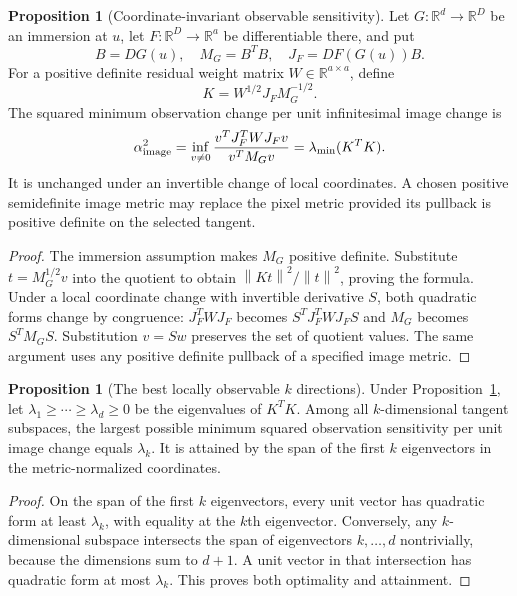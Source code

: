 \documentclass[11pt,a4paper]{article}
\theoremstyle{definition}
\newtheorem{proposition}[theorem]{Proposition}
\theoremstyle{definition}
\theoremstyle{remark}\newtheorem{remark}[theorem]{Remark}
\newcommand{\R}{\mathbb R}\newcommand{\Prob}{\mathbb P}\newcommand{\E}{\mathbb E}
\newcommand{\norm}[1]{\left\lVert #1\right\rVert}
\begin{document}
\begin{proposition}[Coordinate-invariant observable sensitivity]\label{prop:metric}
Let $G:\R^d\to\R^D$ be an immersion at $u$, let $F:\R^D\to\R^a$ be differentiable there, and put
\[
B=DG(u),\quad M_G=B^TB,\quad J_F=DF(G(u))B.
\]
For a positive definite residual weight matrix $W\in\R^{a\times a}$, define
\[
K=W^{1/2}J_FM_G^{-1/2}.
\]
The squared minimum observation change per unit infinitesimal image change is
\begin{equation}\label{eq:intrinsicmetric}
\alpha_{\rm image}^2
=\inf_{v\ne0}\frac{v^TJ_F^TWJ_Fv}{v^TM_Gv}
=\lambda_{\min}(K^TK).
\end{equation}
It is unchanged under an invertible change of local coordinates. A chosen positive semidefinite image metric may replace the pixel metric provided its pullback is positive definite on the selected tangent.
\end{proposition}
\begin{proof}
The immersion assumption makes $M_G$ positive definite. Substitute $t=M_G^{1/2}v$ into the quotient to obtain $\norm{Kt}^2/\norm t^2$, proving the formula. Under a local coordinate change with invertible derivative $S$, both quadratic forms change by congruence: $J_F^TWJ_F$ becomes $S^TJ_F^TWJ_FS$ and $M_G$ becomes $S^TM_GS$. Substitution $v=Sw$ preserves the set of quotient values. The same argument uses any positive definite pullback of a specified image metric.
\end{proof}

\begin{proposition}[The best locally observable $k$ directions]\label{prop:bestdirections}
Under Proposition~\ref{prop:metric}, let
$\lambda_1\ge\cdots\ge\lambda_d\ge0$ be the eigenvalues of $K^TK$. Among all $k$-dimensional tangent subspaces, the largest possible minimum squared observation sensitivity per unit image change equals $\lambda_k$. It is attained by the span of the first $k$ eigenvectors in the metric-normalized coordinates.
\end{proposition}
\begin{proof}
On the span of the first $k$ eigenvectors, every unit vector has quadratic form at least $\lambda_k$, with equality at the $k$th eigenvector. Conversely, any $k$-dimensional subspace intersects the span of eigenvectors $k,\ldots,d$ nontrivially, because the dimensions sum to $d+1$. A unit vector in that intersection has quadratic form at most $\lambda_k$. This proves both optimality and attainment.
\end{proof}
\end{document}

